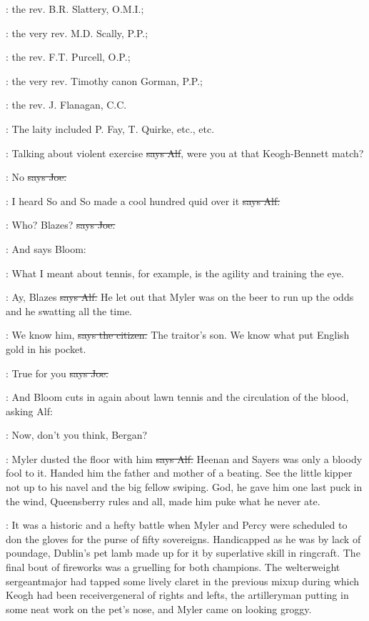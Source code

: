 :
the rev. B.R. Slattery, O.M.I.;

:
the very rev. M.D. Scally, P.P.;

:
the rev. F.T. Purcell, O.P.;

:
the very rev. Timothy canon Gorman, P.P.;

:
the rev. J. Flanagan, C.C.

:
The laity included P. Fay,
T. Quirke,
etc.,
etc.

\bergan:
Talking about violent exercise
\sout{says Alf},
were you at that Keogh-Bennett match?

\joe:
No
\sout{says Joe.}

\bergan:
I heard So and So made a cool hundred quid
over it
\sout{says Alf.}

\joe:
Who?
Blazes?
\sout{says Joe.}

\Nq:
And says Bloom:

\Bloom:
What I meant about tennis,
for example,
is the agility and training the eye.

\bergan:
Ay,
Blazes
\sout{says Alf.}
He let out that Myler was on the beer to run up
the odds and he swatting all the time.

\citizen:
We know him,
\sout{says the citizen.}
The traitor's son.
We know what put
English gold in his pocket.

\joe:
True for you
\sout{says Joe.}

\Nq:
And Bloom cuts in again about lawn tennis and the circulation of the
blood,
asking Alf:

\Bloom:
Now,
don't you think,
Bergan?

\bergan:
Myler dusted the floor with him
\sout{says Alf.}
Heenan and Sayers was only a
bloody fool to it.
Handed him the father and mother of a beating.
See the
little kipper not up to his navel and the big fellow swiping.
God,
he gave
him one last puck in the wind,
Queensberry rules and all,
made him puke
what he never ate.

:
It was a historic and a hefty battle
when Myler and Percy were
scheduled to don the gloves for the purse of fifty sovereigns.
Handicapped
as he was by lack of poundage,
Dublin's pet lamb made up for it by
superlative skill in ringcraft.
The final bout of fireworks was a
gruelling for both champions.
The welterweight sergeantmajor had
tapped some lively claret in the previous mixup during which Keogh
had been receivergeneral of rights and lefts,
the artilleryman
putting in some neat work on the pet's nose,
and Myler came on
looking groggy.

